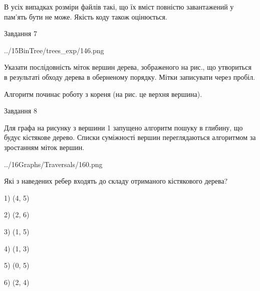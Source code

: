 \documentclass[12pt, ukrainian]{article}
\begin{document}
{В усіх випадках розміри файлів такі, що їх вміст повністю завантажений у пам'ять бути не може. Якість коду також оцінюється.



\vspace{10mm}\par

\newpage
\begin{minipage}[t]{9.7cm}
               
{\begin{center}Завдання {7}\end{center}}
\vspace{-4mm}

\begin{center}
	{../15BinTree/trees_exp/146.png}
\end{center}
Указати послідовність міток вершин дерева, зображеного на рис., що утвориться в результаті обходу дерева в оберненому порядку. Мітки записувати через пробіл.\par Алгоритм починає роботу з кореня (на рис. це верхня вершина).\par

\end{minipage}
\vline \hspace{8mm}
\begin{minipage}[t]{8.0cm}
               
{\begin{center}Завдання {8}\end{center}}
\vspace{-4mm}
Для графа на рисунку з вершини 1 запущено алгоритм пошуку в глибину, що будує кістякове дерево. Списки суміжності вершин переглядаються алгоритмом за зростанням міток вершин.\par
\begin{center}
	{../16Graphs/Traversals/160.png}
\end{center}
\par Які з наведених ребер входять до складу отриманого кістякового дерева?\par
1) (4, 5)\par
2) (2, 6)\par
3) (1, 5)\par
4) (1, 3)\par
5) (0, 5)\par
6) (2, 4)\par
{\vskip 15pt} \par


\end{minipage}}
\end{document}
